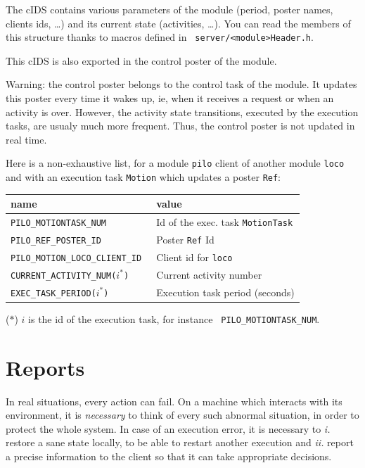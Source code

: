 The cIDS contains various parameters of the module (period, poster names,
clients ids, \ldots) and its current  state (activities, \ldots). You can
read  the members  of this  structure thanks   to macros  defined in {\tt
server/<module>Header.h}.

This cIDS is also exported in the control poster of the module.

Warning: the control poster belongs to the control task of the module.
It updates this poster every time it wakes up, ie, when it receives
a request or when an activity is over. However, the activity state
transitions, executed by the execution tasks, are usualy much more
frequent. Thus, the control poster is not updated in real time.


Here is a non-exhaustive list, for a module {\tt  pilo} client of another
module {\tt loco} and with an execution task {\tt Motion} which updates a
poster {\tt Ref}:

\bigbreak

{\small\begin{tabularx}{0.8\linewidth}{|l|X|}
\hline
name & value\\
\hline
\tt PILO\_MOTIONTASK\_NUM    & Id of the exec. task {\tt MotionTask}\\
\tt PILO\_REF\_POSTER\_ID    & Poster {\tt Ref} Id\\
\tt PILO\_MOTION\_LOCO\_CLIENT\_ID & Client id for {\tt loco}\\
\tt CURRENT\_ACTIVITY\_NUM($i^*$) & Current activity number\\
\tt EXEC\_TASK\_PERIOD($i^*$) & Execution task period (seconds)\\
\hline
\end{tabularx}}

($*$)  $i$ is   the  id  of  the    execution  task, for   instance  {\tt
PILO\_MOTIONTASK\_NUM}.


\section{Reports}

In real situations, every action can fail. On a machine which
interacts with  its environment, it is {\em  necessary} to think of every
such abnormal situation, in order to protect the whole system. In case of
an execution error,  it  is necessary to {\em   i.} restore a sane  state
locally, to be able to restart another  execution and {\em ii.}  report a
precise information   to the  client so  that   it can   take appropriate
decisions.

